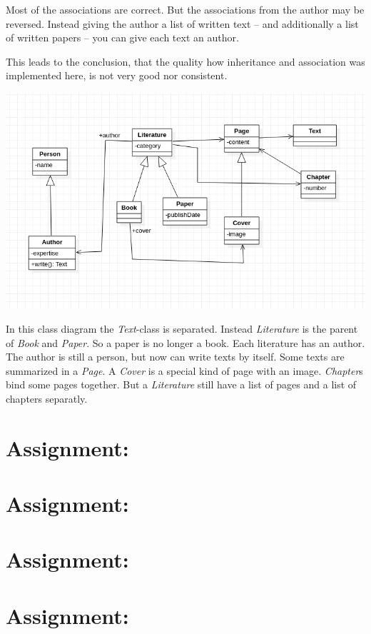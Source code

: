 \documentclass[a4paper,12pt,oneside]{scrreprt}
\begin{document}
    Most of the associations are correct. But the associations from the author may be reversed. Instead giving the author a list of written text -- and additionally a list of written papers -- you can give each text an author.
    
    This leads to the conclusion, that the quality how inheritance and
    association was implemented here, is not very good nor consistent.
    
    \includegraphics[width=\textwidth]{../uml/2_2.png}
    
    In this class diagram the \textit{Text}-class is separated. Instead \textit{Literature} is the parent of \textit{Book} and \textit{Paper}. So a paper is no longer a book. Each literature has an author. The author is still a person, but now can write texts by itself. Some texts are summarized in a \textit{Page}. A \textit{Cover} is a special kind of page with an image. \textit{Chapter}s bind some pages together. But a \textit{Literature} still have a list of pages and a list of chapters separatly.
    
	\section{Assignment:}
	\section{Assignment:}
	\section{Assignment:}
	\section{Assignment:}
	\section{}
	
	\section{}
	
\end{document}
